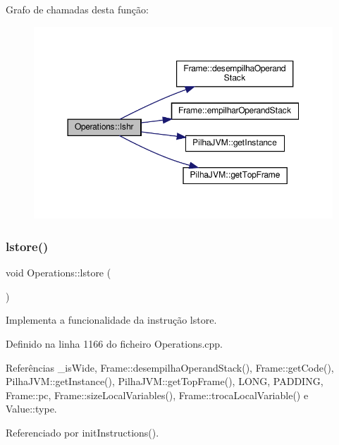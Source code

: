 Grafo de chamadas desta função\+:\nopagebreak
\begin{figure}[H]
\begin{center}
\leavevmode
\includegraphics[width=350pt]{classOperations_aa886b0d027fb5b030016af6100541e81_cgraph}
\end{center}
\end{figure}
\mbox{\label{classOperations_a233917ec136fa6ce064f04b410e15f87}} 
\subsubsection{\texorpdfstring{lstore()}{lstore()}}
{\footnotesize\ttfamily void Operations\+::lstore (\begin{DoxyParamCaption}{ }\end{DoxyParamCaption})\hspace{0.3cm}{\ttfamily [private]}}



Implementa a funcionalidade da instrução lstore. 



Definido na linha 1166 do ficheiro Operations.\+cpp.



Referências \+\_\+is\+Wide, Frame\+::desempilha\+Operand\+Stack(), Frame\+::get\+Code(), Pilha\+J\+V\+M\+::get\+Instance(), Pilha\+J\+V\+M\+::get\+Top\+Frame(), L\+O\+NG, P\+A\+D\+D\+I\+NG, Frame\+::pc, Frame\+::size\+Local\+Variables(), Frame\+::troca\+Local\+Variable() e Value\+::type.



Referenciado por init\+Instructions().

